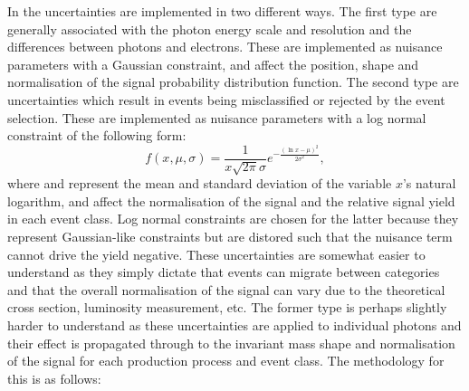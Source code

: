 In the \MFM uncertainties are implemented in two different ways. The first type are generally associated with the photon energy scale and resolution and the differences between photons and electrons. These are implemented as nuisance parameters with a Gaussian constraint, and affect the position, shape and normalisation of the signal probability distribution function. The second type are uncertainties which result in events being misclassified or rejected by the event selection. These are implemented as nuisance parameters with a log normal constraint of the following form:
\begin{equation}
  f(x,\mu,\sigma) = \frac{1}{x\sqrt{2\pi}\sigma}e^{-\frac{(\ln x - \mu)^{2}}{2\sigma^{2}}},
\end{equation}
where \mu and \sigma represent the mean and standard deviation of the variable $x$'s natural logarithm,
and affect the normalisation of the signal and the relative signal yield in each event class. Log normal constraints
are chosen for the latter because they represent Gaussian-like constraints but are distored such that the nuisance term cannot drive the yield negative. These uncertainties are somewhat easier to understand as they simply dictate that events can migrate between categories and that the overall normalisation of the signal can vary due to the theoretical cross section, luminosity measurement, etc. The former type is perhaps slightly harder to understand as these uncertainties are applied to individual photons and their effect is propagated through to the invariant mass shape and normalisation of the signal for each production process and event class. The methodology for this is as follows:

